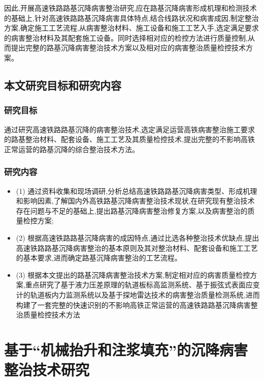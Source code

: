 \documentclass[a4paper,12pt]{ctexrep}
\begin{document}
因此,开展高速铁路路基沉降病害整治研究,应在路基沉降病害形成机理和检测技术的基础上,针对高速铁路路基沉降病害具体特点,结合线路状况和病害成因,制定整治方案,确定施工工艺流程,从病害整治材料、施工设备和施工工艺入手,选定满足要求的病害整治材料及其配套施工设备。同时选择相对应的检控方法进行质量控制,从而提出完整的路基沉降病害整治技术方案以及相对应的病害整治质量检控技术方案。

\section{本文研究目标和研究内容}

\subsection{研究目标}

通过研究高速铁路路基沉降的病害整治技术,选定满足运营高铁病害整治施工要求的路基整治材料、配套设备、施工工艺及其质量检控技术,提出完整的不影响高铁正常运营的路基沉降的综合整治技术方法。

\subsection{研究内容}

\begin{itemize}
    \item (1) 通过资料收集和现场调研,分析总结高速铁路路基沉降病害类型、形成机理和影响因素,了解国内外高铁路基沉降病害整治技术现状,在研究现有整治技术存在问题与不足的基础上,提出路基沉降病害整治修复方案,以及病害整治的质量检控方案;
    \item (2) 根据高速铁路路基沉降病害的成因特点,通过比选各种整治技术优缺点,提出高速铁路路基沉降病害整治的基本原则及其对整治材料、配套设备和施工工艺的基本要求,进而确定路基沉降病害整治的工艺流程。
    \item (3) 根据本文提出的路基沉降病害整治技术方案,制定相对应的病害质量检控方案,重点研究了基于液力压差原理的轨道板标高监测系统、基于振弦式表面应变计的轨道板内力监测系统以及基于探地雷达技术的病害整治质量检测系统,进而构建了一套完整的快速识别的不影响高铁正常运营的高速铁路路基沉降病害整治质量检控技术方法
\end{itemize}

\chapter{基于“机械抬升和注浆填充”的沉降病害整治技术研究}
\end{document}
